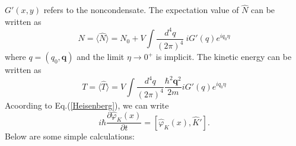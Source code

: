 \documentclass[12pt]{article}
\begin{document}
$G'(x,y)$ refers to the noncondensate. The expectation value of $\hat{N}$ can be 
written as 
\begin{equation}\label{N}
    N=\langle\hat{N}\rangle=N_0+V\int \frac{d^4q}{(2\pi)^4}\ iG'(q)e^{iq_0\eta}
\end{equation}
where $q=(q_0,\mathbf{q})$ and the limit $\eta\rightarrow 0^{+}$ is implicit. The 
kinetic energy can be written as 
\begin{equation}
    T=\langle\hat{T}\rangle=V\int \frac{d^4q}{(2\pi)^4}\frac{\hbar^2\mathbf{q}^2}
    {2m}iG'(q)e^{iq_0\eta}
\end{equation}
Acoording to Eq.(\ref{Heisenberg}), we can write
\begin{equation}\label{HeisenbergEq}
    i\hbar\frac{\partial\hat{\varphi}_K(x)}{\partial t}=[\hat{\varphi}_K(x),\hat{K}'].
\end{equation}
Below are some simple calculations:
\end{document}
